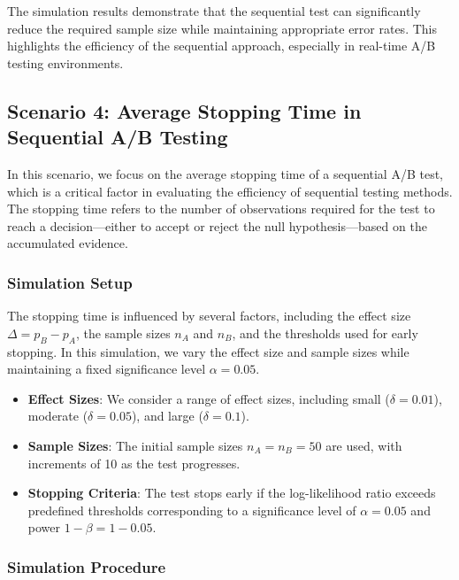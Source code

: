 \documentclass[magisterska, english]{pwr_wmat_praca_dyplomowa}
\theoremstyle{plain}
\numberwithin{theorem}{chapter}
\theoremstyle{definition}
\numberwithin{theorem}{chapter}
\begin{document}
The simulation results demonstrate that the sequential test can significantly reduce the required sample size while maintaining appropriate error rates. This highlights the efficiency of the sequential approach, especially in real-time A/B testing environments.

\subsection{Scenario 4: Average Stopping Time in Sequential A/B Testing}

In this scenario, we focus on the average stopping time of a sequential A/B test, which is a critical factor in evaluating the efficiency of sequential testing methods. The stopping time refers to the number of observations required for the test to reach a decision—either to accept or reject the null hypothesis—based on the accumulated evidence.

\subsubsection{Simulation Setup}

The stopping time is influenced by several factors, including the effect size \( \Delta = p_B - p_A \), the sample sizes \( n_A \) and \( n_B \), and the thresholds used for early stopping. In this simulation, we vary the effect size and sample sizes while maintaining a fixed significance level \( \alpha = 0.05 \).

\begin{itemize}
	\item \textbf{Effect Sizes}: We consider a range of effect sizes, including small (\( \delta = 0.01 \)), moderate (\( \delta = 0.05 \)), and large (\( \delta = 0.1 \)).
	\item \textbf{Sample Sizes}: The initial sample sizes \( n_A = n_B = 50 \) are used, with increments of 10 as the test progresses.
	\item \textbf{Stopping Criteria}: The test stops early if the log-likelihood ratio exceeds predefined thresholds corresponding to a significance level of \( \alpha = 0.05\) and power \( 1 - \beta = 1 - 0.05  \).
\end{itemize}

\subsubsection{Simulation Procedure}
\end{document}
